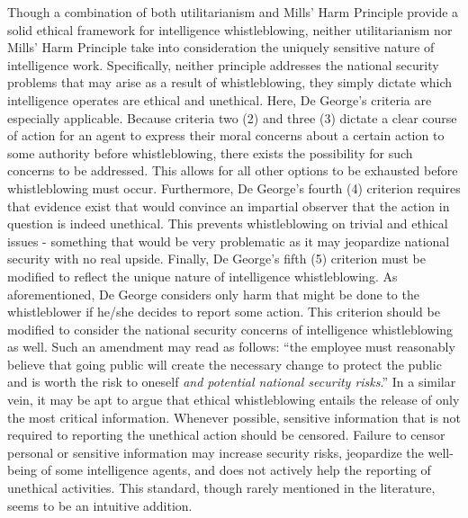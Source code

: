 \documentclass [12 pt] {article}
\begin{document}
\bigbreak
Though a combination of both utilitarianism and Mills' Harm Principle provide a solid ethical framework for intelligence whistleblowing, neither utilitarianism nor Mills' Harm Principle take into consideration the uniquely sensitive nature of intelligence work. Specifically, neither principle addresses the national security problems that may arise as a result of whistleblowing, they simply dictate which intelligence operates are ethical and unethical. Here, De George's criteria are especially applicable. Because criteria two (2) and three (3) dictate a clear course of action for an agent to express their moral concerns about a certain action to some authority before whistleblowing, there exists the possibility for such concerns to be addressed. This allows for all other options to be exhausted before whistleblowing must occur. Furthermore, De George's fourth (4) criterion requires that evidence exist that would convince an impartial observer that the action in question is indeed unethical. This prevents whistleblowing on trivial and ethical issues - something that would be very problematic as it may jeopardize national security with no real upside. Finally, De George's fifth (5) criterion must be modified to reflect the unique nature of intelligence whistleblowing. As aforementioned, De George considers only harm that might be done to the whistleblower if he/she decides to report some action. This criterion should be modified to consider the national security concerns of intelligence whistleblowing as well. Such an amendment may read as follows: ``the employee must reasonably believe that going public will create the necessary change to protect the public and is worth the risk to oneself \textit{and potential national security risks}.''
\bigbreak
In a similar vein, it may be apt to argue that ethical whistleblowing entails the release of only the most critical information. Whenever possible, sensitive information that is not required to reporting the unethical action should be censored. Failure to censor personal or sensitive information may increase security risks, jeopardize the well-being of some intelligence agents, and does not actively help the reporting of unethical activities. This standard, though rarely mentioned in the literature, seems to be an intuitive addition.
\end{document}
